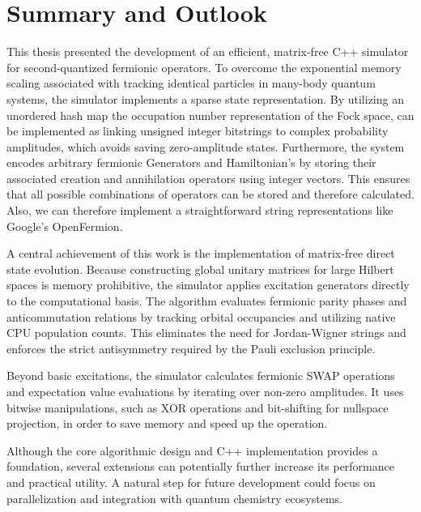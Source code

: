\chapter{Summary and Outlook}
\label{c:summary}



This thesis presented the development of an efficient, matrix-free C++ simulator for second-quantized fermionic operators.
To overcome the exponential memory scaling associated with tracking identical particles in many-body quantum systems, the simulator implements a sparse state representation.
By utilizing an unordered hash map the occupation number representation of the Fock space, can be implemented as linking unsigned integer bitstrings to complex probability amplitudes, which avoids saving zero-amplitude states.
Furthermore, the system encodes arbitrary fermionic Generators and Hamiltonian's by storing their associated creation and annihilation operators using integer vectors.
This ensures that all possible combinations of operators can be stored and therefore calculated.
Also, we can therefore implement a straightforward string representations like  Google's OpenFermion.

A central achievement of this work is the implementation of matrix-free direct state evolution.
Because constructing global unitary matrices for large Hilbert spaces is memory prohibitive, the simulator applies excitation generators directly to the computational basis.
The algorithm evaluates fermionic parity phases and anticommutation relations by tracking orbital occupancies and utilizing native CPU population counts.
This eliminates the need for Jordan-Wigner strings and enforces the strict antisymmetry required by the Pauli exclusion principle.

Beyond basic excitations, the simulator calculates fermionic SWAP operations and expectation value evaluations by iterating over non-zero amplitudes.
It uses bitwise manipulations, such as XOR operations and bit-shifting for nullspace projection, in order to save memory and speed up the operation.


Although the core algorithmic design and C++ implementation provides a foundation, several extensions can potentially further increase its performance and practical utility.
A natural step for future development could focus on parallelization and integration with quantum chemistry ecosystems.

